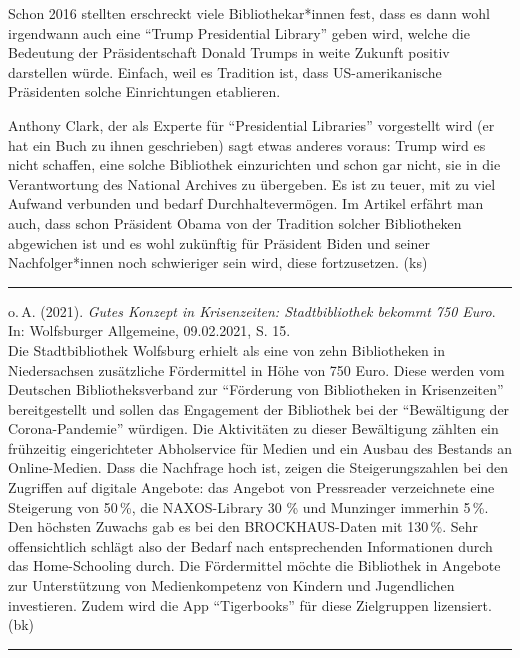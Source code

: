 \documentclass[a4paper,
fontsize=11pt,
oneside,
numbers=noperiodatend,
parskip=half-,
bibliography=totoc,
final
]{scrartcl}
\begin{document}
Schon 2016 stellten erschreckt viele Bibliothekar*innen fest, dass es
dann wohl irgendwann auch eine \enquote{Trump Presidential Library}
geben wird, welche die Bedeutung der Präsidentschaft Donald Trumps in
weite Zukunft positiv darstellen würde. Einfach, weil es Tradition ist,
dass US-amerikanische Präsidenten solche Einrichtungen etablieren.

Anthony Clark, der als Experte für \enquote{Presidential Libraries}
vorgestellt wird (er hat ein Buch zu ihnen geschrieben) sagt etwas
anderes voraus: Trump wird es nicht schaffen, eine solche Bibliothek
einzurichten und schon gar nicht, sie in die Verantwortung des National
Archives zu übergeben. Es ist zu teuer, mit zu viel Aufwand verbunden
und bedarf Durchhaltevermögen. Im Artikel erfährt man auch, dass schon
Präsident Obama von der Tradition solcher Bibliotheken abgewichen ist
und es wohl zukünftig für Präsident Biden und seiner Nachfolger*innen
noch schwieriger sein wird, diese fortzusetzen. (ks)

\begin{center}\rule{0.5\linewidth}{0.5pt}\end{center}

o.\,A. (2021). \emph{Gutes Konzept in Krisenzeiten: Stadtbibliothek
bekommt 750 Euro}. In: Wolfsburger Allgemeine, 09.02.2021, S. 15.\\
Die Stadtbibliothek Wolfsburg erhielt als eine von zehn Bibliotheken in
Niedersachsen zusätzliche Fördermittel in Höhe von 750 Euro. Diese
werden vom Deutschen Bibliotheksverband zur \enquote{Förderung von
Bibliotheken in Krisenzeiten} bereitgestellt und sollen das Engagement
der Bibliothek bei der \enquote{Bewältigung der Corona-Pandemie}
würdigen. Die Aktivitäten zu dieser Bewältigung zählten ein frühzeitig
eingerichteter Abholservice für Medien und ein Ausbau des Bestands an
Online-Medien. Dass die Nachfrage hoch ist, zeigen die Steigerungszahlen
bei den Zugriffen auf digitale Angebote: das Angebot von Pressreader
verzeichnete eine Steigerung von 50\,\%, die NAXOS-Library 30 \% und
Munzinger immerhin 5\,\%. Den höchsten Zuwachs gab es bei den
BROCKHAUS-Daten mit 130\,\%. Sehr offensichtlich schlägt also der Bedarf
nach entsprechenden Informationen durch das Home-Schooling durch. Die
Fördermittel möchte die Bibliothek in Angebote zur Unterstützung von
Medienkompetenz von Kindern und Jugendlichen investieren. Zudem wird die
App \enquote{Tigerbooks} für diese Zielgruppen lizensiert. (bk)

\begin{center}\rule{0.5\linewidth}{0.5pt}\end{center}
\end{document}
